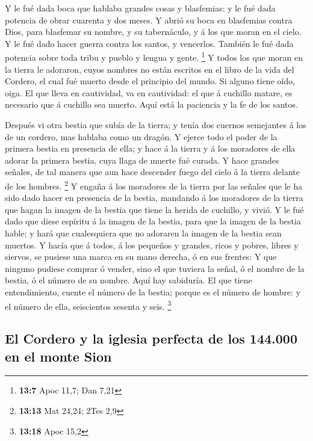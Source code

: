  Y le fué dada boca que hablaba grandes cosas y
blasfemias: y le fué dada potencia de obrar cuarenta y dos meses.
 Y abrió su boca en blasfemias contra Dios, para blasfemar
su nombre, y su tabernáculo, y á los que moran en el cielo.
 Y le fué dado hacer guerra contra los santos, y
vencerlos. También le fué dada potencia sobre toda tribu y pueblo y
lengua y gente. \footnote{\textbf{13:7} Apoc 11,7; Dan 7,21}
 Y todos los que moran en la tierra le adoraron, cuyos
nombres no están escritos en el libro de la vida del Cordero, el cual
fué muerto desde el principio del mundo.  Si alguno tiene
oído, oiga.  El que lleva en cautividad, va en
cautividad: el que á cuchillo matare, es necesario que á cuchillo sea
muerto. Aquí está la paciencia y la fe de los santos.

 Después vi otra bestia que subía de la tierra; y tenía
dos cuernos semejantes á los de un cordero, mas hablaba como un dragón.
 Y ejerce todo el poder de la primera bestia en presencia
de ella; y hace á la tierra y á los moradores de ella adorar la primera
bestia, cuya llaga de muerte fué curada.  Y hace grandes
señales, de tal manera que aun hace descender fuego del cielo á la
tierra delante de los hombres. \footnote{\textbf{13:13} Mat 24,24; 2Tes
  2,9}  Y engaña á los moradores de la tierra por las
señales que le ha sido dado hacer en presencia de la bestia, mandando á
los moradores de la tierra que hagan la imagen de la bestia que tiene la
herida de cuchillo, y vivió.  Y le fué dado que diese
espíritu á la imagen de la bestia, para que la imagen de la bestia
hable; y hará que cualesquiera que no adoraren la imagen de la bestia
sean muertos.  Y hacía que á todos, á los pequeños y
grandes, ricos y pobres, libres y siervos, se pusiese una marca en su
mano derecha, ó en sus frentes:  Y que ninguno pudiese
comprar ó vender, sino el que tuviera la señal, ó el nombre de la
bestia, ó el número de su nombre.  Aquí hay sabiduría. El
que tiene entendimiento, cuente el número de la bestia; porque es el
número de hombre: y el número de ella, seiscientos sesenta y seis.
\footnote{\textbf{13:18} Apoc 15,2}

\hypertarget{el-cordero-y-la-iglesia-perfecta-de-los-144.000-en-el-monte-sion}{%
\subsection{El Cordero y la iglesia perfecta de los 144.000 en el monte
Sion}\label{el-cordero-y-la-iglesia-perfecta-de-los-144.000-en-el-monte-sion}}

